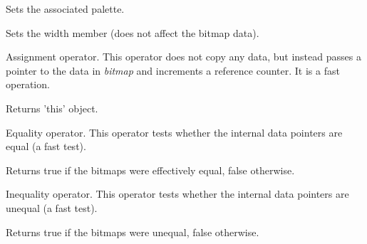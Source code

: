 Sets the associated palette.







Sets the width member (does not affect the bitmap data).





Assignment operator. This operator does not copy any data, but instead
passes a pointer to the data in {\it bitmap} and increments a reference
counter. It is a fast operation.




Returns 'this' object.



Equality operator. This operator tests whether the internal data pointers are
equal (a fast test).




Returns true if the bitmaps were effectively equal, false otherwise.



Inequality operator. This operator tests whether the internal data pointers are
unequal (a fast test).




Returns true if the bitmaps were unequal, false otherwise.

